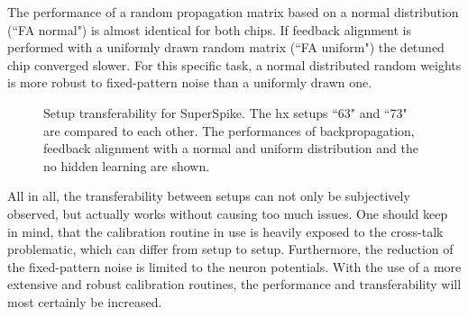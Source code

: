 The performance of a random propagation matrix based on a normal distribution (``FA normal") is almost identical for both chips. If feedback alignment is performed with a uniformly drawn random matrix (``FA uniform") the detuned chip converged slower. For this specific task, a normal distributed random weights is more robust to fixed-pattern noise than a uniformly drawn one. 
\begin{figure}[htb!]
	\begin{subfigure}{0.245\textwidth}
		\caption{}
		\vspace{-0.3cm}
		\centering
		
		\label{hx63vs73bp}
	\end{subfigure}
	\begin{subfigure}{0.245\textwidth}
		\caption{}
		\vspace{-0.3cm}
		\centering
		
		\label{hx63vs73fanormal}
	\end{subfigure}
	\begin{subfigure}{0.245\textwidth}
		\caption{}
		\vspace{-0.3cm}
		\centering
		
		\label{hx63vs73fauniform}
	\end{subfigure}
	\begin{subfigure}{0.245\textwidth}
		\caption{}
		\vspace{-0.3cm}
		\centering
		
		\label{hx63vs73nohidden}
	\end{subfigure}
	\caption[Setup transferability for SuperSpike.]{Setup transferability for SuperSpike. The \gls{hx} setups ``63" and ``73" are compared to each other. The performances of backpropagation, feedback alignment with a normal and uniform distribution and the no hidden learning are shown.}
	\label{hxsetuptransferability}
\end{figure}
All in all, the transferability between setups can not only be subjectively observed, but actually works without causing too much issues. One should keep in mind, that the calibration routine in use is heavily exposed to the cross-talk problematic, which can differ from setup to setup. Furthermore, the reduction of the fixed-pattern noise is limited to the neuron potentials. With the use of a more extensive and robust calibration routines, the performance and transferability will most certainly be increased. 

